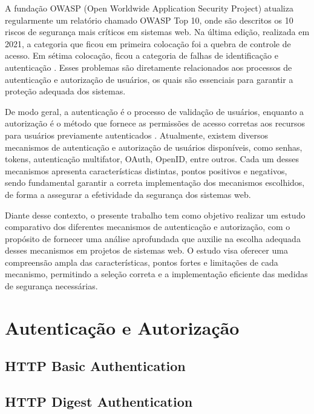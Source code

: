 \documentclass[12pt]{article}
\begin{document}
A fundação OWASP (Open Worldwide Application Security Project) atualiza
regularmente um relatório chamado OWASP Top 10, onde são descritos os 10 riscos
de segurança mais críticos em sistemas web. Na última edição, realizada em 2021, a
categoria que ficou em primeira colocação foi a quebra de controle de acesso. Em
sétima colocação, ficou a categoria de falhas de identificação e autenticação 
\cite{OWASP2021}. Esses problemas são diretamente relacionados aos processos de 
autenticação e autorização de usuários, os quais são essenciais para garantir a 
proteção adequada dos sistemas.

De modo geral, a autenticação é o processo de validação de usuários, enquanto a 
autorização é o método que fornece as permissões de acesso corretas aos recursos 
para usuários previamente autenticados \cite{TUMIN2012}. Atualmente, existem diversos 
mecanismos de autenticação e autorização de usuários disponíveis, como senhas, tokens, 
autenticação multifator, OAuth, OpenID, entre outros. Cada um desses mecanismos 
apresenta características distintas, pontos positivos e negativos, sendo fundamental 
garantir a correta implementação dos mecanismos escolhidos, de forma a assegurar a 
efetividade da segurança dos sistemas web. 

Diante desse contexto, o presente trabalho tem como objetivo realizar um estudo 
comparativo dos diferentes mecanismos de autenticação e autorização, com o propósito 
de fornecer uma análise aprofundada que auxilie na escolha adequada desses mecanismos 
em projetos de sistemas web. O estudo visa oferecer uma compreensão ampla das 
características, pontos fortes e limitações de cada mecanismo, permitindo a seleção 
correta e a implementação eficiente das medidas de segurança necessárias.

\section{Autenticação e Autorização}



\subsection{HTTP Basic Authentication}



\subsection{HTTP Digest Authentication}
\end{document}
